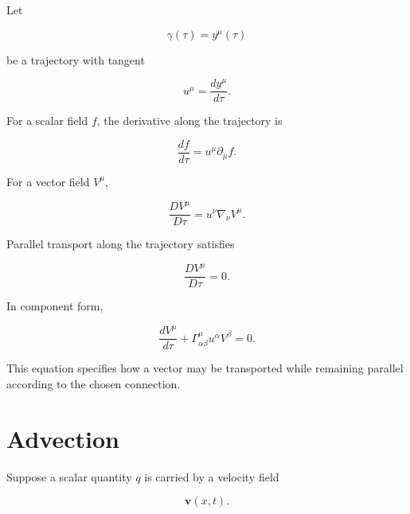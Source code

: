 \documentclass[12pt,oneside]{book}
\begin{document}
Let

\begin{equation}
    \gamma(\tau)
    =
    y^\mu(\tau)
\end{equation}

be a trajectory with tangent

\begin{equation}
    u^\mu
    =
    \frac{dy^\mu}{d\tau}.
\end{equation}

For a scalar field \(f\), the derivative along the trajectory is

\begin{equation}
    \frac{df}{d\tau}
    =
    u^\mu
    \partial_\mu f.
    \label{eq:scalar-trajectory-derivative}
\end{equation}

For a vector field \(V^\mu\),

\begin{equation}
    \frac{D V^\mu}{D\tau}
    =
    u^\nu
    \nabla_\nu V^\mu.
    \label{eq:vector-trajectory-transport}
\end{equation}

Parallel transport along the trajectory satisfies

\begin{equation}
    \frac{D V^\mu}{D\tau}
    =
    0.
    \label{eq:parallel-transport}
\end{equation}

In component form,

\begin{equation}
    \frac{dV^\mu}{d\tau}
    +
    \Gamma^\mu_{\alpha\beta}
    u^\alpha V^\beta
    =
    0.
    \label{eq:parallel-transport-expanded}
\end{equation}

This equation specifies how a vector may be transported while
remaining parallel according to the chosen connection.


\section{Advection}
\label{sec:advection}

Suppose a scalar quantity \(q\) is carried by a velocity field

\begin{equation}
    \mathbf{v}(x,t).
\end{equation}
\end{document}
